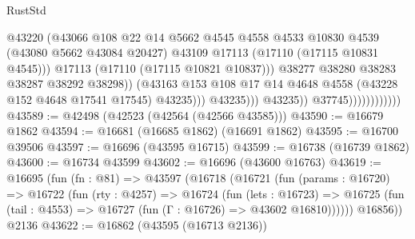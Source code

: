 \begin{lexlean}{RustStd}
\begin{coremodule}
                                                @43220
                                                (@43066
                                                  @108
                                                  @22
                                                  @14
                                                  @5662
                                                  @4545
                                                  @4558
                                                  @4533
                                                  @10830
                                                  @4539
                                                  (@43080 @5662 @43084 @20427)
                                                  @43109
                                                  @17113
                                                  (@17110 (@17115 @10831 @4545)))
                                                @17113
                                                (@17110 (@17115 @10821 @10837)))
                                              @38277
                                              @38280
                                              @38283
                                              @38287
                                              @38292
                                              @38298))
                                          (@43163
                                            @153
                                            @108
                                            @17
                                            @14
                                            @4648
                                            @4558
                                            (@43228 @152 @4648 @17541 @17545)
                                            @43235)))
                                      @43235)))
                                @43235))
                            @37745))))))))))))
@43589 := @42498 (@42523 (@42564 (@42566 @43585)))
@43590 := @16679 @1862
@43594 := @16681 (@16685 @1862) (@16691 @1862)
@43595 := @16700 @39506
@43597 := @16696 (@43595 @16715)
@43599 := @16738 (@16739 @1862)
@43600 := @16734 @43599
@43602 := @16696 (@43600 @16763)
@43619 := @16695
    (fun (fn : @81) =>
    @43597
      (@16718
        (@16721
          (fun (params : @16720) =>
          @16722
            (fun (rty : @4257) =>
            @16724
              (fun (lets : @16723) =>
              @16725 (fun (tail : @4553) => @16727 (fun (Γ : @16726) => @43602 @16810))))))
        @16856))
    @2136
@43622 := @16862 (@43595 (@16713 @2136))

\end{coremodule}
\end{lexlean}
